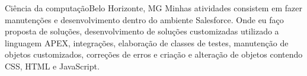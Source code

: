 \documentclass[
    10pt,
    A4,
    english,
    draft = false,
    twoside = false,
]{article}
\begin{document}

	
	\cvtitle{ }	
	{Ciência da computação}{Belo Horizonte, MG}{}
	{Minhas atividades consistem em fazer manutenções e desenvolvimento dentro do ambiente Salesforce. Onde eu faço proposta de soluções, desenvolvimento de soluções customizadas utilizado a linguagem APEX, integrações, elaboração de classes de testes, manutenção de objetos customizados, correções de erros e criação e alteração de objetos contendo CSS, HTML e JavaScript.}
\end{document}
